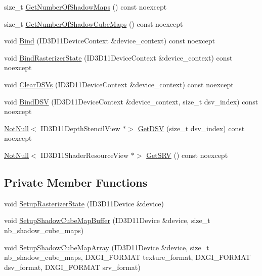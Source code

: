 \begin{DoxyCompactItemize}
\item 
size\+\_\+t \hyperlink{classmage_1_1rendering_1_1_shadow_cube_map_buffer_a491b9a0306748de68b2cb391e572cb7d}{Get\+Number\+Of\+Shadow\+Maps} () const noexcept
\item 
size\+\_\+t \hyperlink{classmage_1_1rendering_1_1_shadow_cube_map_buffer_a6641e56d3f586ab2cdc74d26b8877168}{Get\+Number\+Of\+Shadow\+Cube\+Maps} () const noexcept
\item 
void \hyperlink{classmage_1_1rendering_1_1_shadow_cube_map_buffer_a584f753f82c2378a8c7171bdf5a96999}{Bind} (I\+D3\+D11\+Device\+Context \&device\+\_\+context) const noexcept
\item 
void \hyperlink{classmage_1_1rendering_1_1_shadow_cube_map_buffer_aa206227920ac298eb4dcfdc8e662663d}{Bind\+Rasterizer\+State} (I\+D3\+D11\+Device\+Context \&device\+\_\+context) const noexcept
\item 
void \hyperlink{classmage_1_1rendering_1_1_shadow_cube_map_buffer_a31df46f6fe89cbaedb7f256ab7ecf514}{Clear\+D\+S\+Vs} (I\+D3\+D11\+Device\+Context \&device\+\_\+context) const noexcept
\item 
void \hyperlink{classmage_1_1rendering_1_1_shadow_cube_map_buffer_ad64e3c0b0c537e4e3f6b301fefb5c60a}{Bind\+D\+SV} (I\+D3\+D11\+Device\+Context \&device\+\_\+context, size\+\_\+t dsv\+\_\+index) const noexcept
\item 
\hyperlink{namespacemage_a8769f9d670d6b585ea306cb1062af94b}{Not\+Null}$<$ I\+D3\+D11\+Depth\+Stencil\+View $\ast$$>$ \hyperlink{classmage_1_1rendering_1_1_shadow_cube_map_buffer_a244e06f9f499496fe721af7f1bd2ea5f}{Get\+D\+SV} (size\+\_\+t dsv\+\_\+index) const noexcept
\item 
\hyperlink{namespacemage_a8769f9d670d6b585ea306cb1062af94b}{Not\+Null}$<$ I\+D3\+D11\+Shader\+Resource\+View $\ast$$>$ \hyperlink{classmage_1_1rendering_1_1_shadow_cube_map_buffer_a2586fb38441a14c38045bc3b6a940161}{Get\+S\+RV} () const noexcept
\end{DoxyCompactItemize}
\subsection*{Private Member Functions}
\begin{DoxyCompactItemize}
\item 
void \hyperlink{classmage_1_1rendering_1_1_shadow_cube_map_buffer_a65d31b9a335e6c27c8d4d6e0127029b2}{Setup\+Rasterizer\+State} (I\+D3\+D11\+Device \&device)
\item 
void \hyperlink{classmage_1_1rendering_1_1_shadow_cube_map_buffer_a4b6e895628905a9ddbaccfafb6a1d5b6}{Setup\+Shadow\+Cube\+Map\+Buffer} (I\+D3\+D11\+Device \&device, size\+\_\+t nb\+\_\+shadow\+\_\+cube\+\_\+maps)
\item 
void \hyperlink{classmage_1_1rendering_1_1_shadow_cube_map_buffer_ac800b8fde94ee7527ce09370b4f9e44a}{Setup\+Shadow\+Cube\+Map\+Array} (I\+D3\+D11\+Device \&device, size\+\_\+t nb\+\_\+shadow\+\_\+cube\+\_\+maps, D\+X\+G\+I\+\_\+\+F\+O\+R\+M\+AT texture\+\_\+format, D\+X\+G\+I\+\_\+\+F\+O\+R\+M\+AT dsv\+\_\+format, D\+X\+G\+I\+\_\+\+F\+O\+R\+M\+AT srv\+\_\+format)
\end{DoxyCompactItemize}
